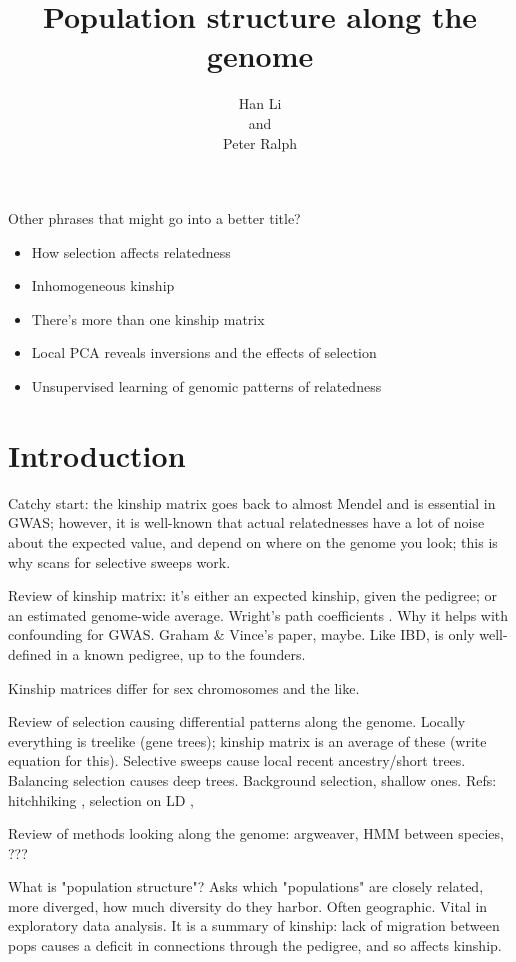 \documentclass{article}
\title{Population structure along the genome}
\author{
Han Li
\\and\\
Peter Ralph
}
\begin{document}
Other phrases that might go into a better title?
\begin{itemize}
    \item How selection affects relatedness
    \item Inhomogeneous kinship
    \item There's more than one kinship matrix
    \item Local PCA reveals inversions and the effects of selection
    \item Unsupervised learning of genomic patterns of relatedness
\end{itemize}


\section{Introduction}


Catchy start: the kinship matrix goes back to almost Mendel and is essential in GWAS;
however, it is well-known that actual relatednesses have a lot of noise about the expected value,
and depend on where on the genome you look;
this is why scans for selective sweeps work.

Review of kinship matrix: 
it's either an expected kinship, given the pedigree;
or an estimated genome-wide average.
Wright's path coefficients \citep{wright1943isolation}.
Why it helps with confounding for GWAS.
Graham \& Vince's paper, maybe.
Like IBD, is only well-defined in a known pedigree, up to the founders.

Kinship matrices differ for sex chromosomes and the like.

Review of selection causing differential patterns along the genome.
Locally everything is treelike (gene trees);
kinship matrix is an average of these (write equation for this).
Selective sweeps cause local recent ancestry/short trees.
Balancing selection causes deep trees.
Background selection, shallow ones.
Refs: hitchhiking \citep{maynardsmith1974hitchhiking},
selection on LD \citep{mcvean2007structure},

Review of methods looking along the genome:
argweaver, HMM between species, ???

What is "population structure"?
Asks which "populations" are closely related, more diverged, how much diversity do they harbor.
Often geographic.
Vital in exploratory data analysis.
It is a summary of kinship: 
lack of migration between pops causes a deficit in connections through the pedigree,
and so affects kinship.
\end{document}
